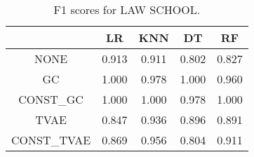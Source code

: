 \begin{table}
\caption{F1 scores for LAW SCHOOL.}
\label{tab:f1-LAW SCHOOL}
\begin{tabular}{ccccc}
\toprule
 & LR & KNN & DT & RF \\
\midrule
NONE & 0.913 & 0.911 & 0.802 & 0.827 \\
GC & 1.000 & 0.978 & 1.000 & 0.960 \\
CONST\_GC & 1.000 & 1.000 & 0.978 & 1.000 \\
TVAE & 0.847 & 0.936 & 0.896 & 0.891 \\
CONST\_TVAE & 0.869 & 0.956 & 0.804 & 0.911 \\
\bottomrule
\end{tabular}
\end{table}
